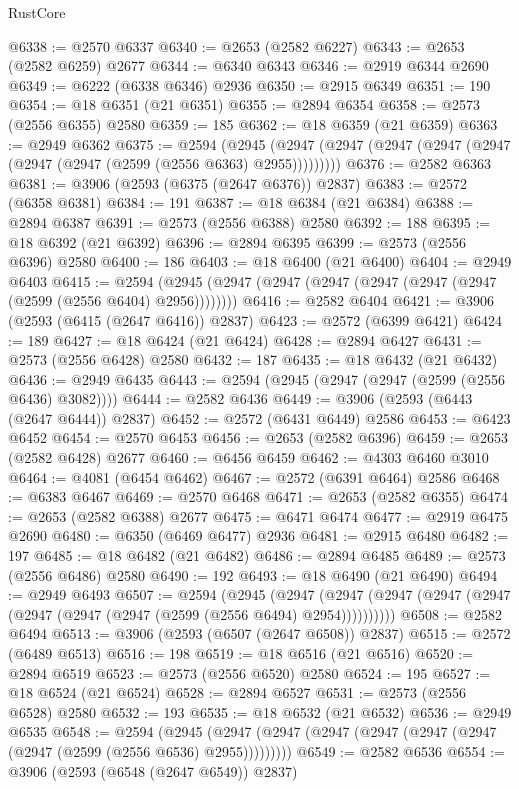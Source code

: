 \begin{lexlean}{RustCore}
\begin{coremodule}
@6338 := @2570 @6337
@6340 := @2653 (@2582 @6227)
@6343 := @2653 (@2582 @6259) @2677
@6344 := @6340 @6343
@6346 := @2919 @6344 @2690
@6349 := @6222 (@6338 @6346) @2936
@6350 := @2915 @6349
@6351 := 190
@6354 := @18 @6351 (@21 @6351)
@6355 := @2894 @6354
@6358 := @2573 (@2556 @6355) @2580
@6359 := 185
@6362 := @18 @6359 (@21 @6359)
@6363 := @2949 @6362
@6375 := @2594
    (@2945 (@2947 (@2947 (@2947 (@2947 (@2947 (@2947 (@2947 (@2599 (@2556 @6363) @2955)))))))))
@6376 := @2582 @6363
@6381 := @3906 (@2593 (@6375 (@2647 @6376)) @2837)
@6383 := @2572 (@6358 @6381)
@6384 := 191
@6387 := @18 @6384 (@21 @6384)
@6388 := @2894 @6387
@6391 := @2573 (@2556 @6388) @2580
@6392 := 188
@6395 := @18 @6392 (@21 @6392)
@6396 := @2894 @6395
@6399 := @2573 (@2556 @6396) @2580
@6400 := 186
@6403 := @18 @6400 (@21 @6400)
@6404 := @2949 @6403
@6415 := @2594 (@2945 (@2947 (@2947 (@2947 (@2947 (@2947 (@2947 (@2599 (@2556 @6404) @2956))))))))
@6416 := @2582 @6404
@6421 := @3906 (@2593 (@6415 (@2647 @6416)) @2837)
@6423 := @2572 (@6399 @6421)
@6424 := 189
@6427 := @18 @6424 (@21 @6424)
@6428 := @2894 @6427
@6431 := @2573 (@2556 @6428) @2580
@6432 := 187
@6435 := @18 @6432 (@21 @6432)
@6436 := @2949 @6435
@6443 := @2594 (@2945 (@2947 (@2947 (@2599 (@2556 @6436) @3082))))
@6444 := @2582 @6436
@6449 := @3906 (@2593 (@6443 (@2647 @6444)) @2837)
@6452 := @2572 (@6431 @6449) @2586
@6453 := @6423 @6452
@6454 := @2570 @6453
@6456 := @2653 (@2582 @6396)
@6459 := @2653 (@2582 @6428) @2677
@6460 := @6456 @6459
@6462 := @4303 @6460 @3010
@6464 := @4081 (@6454 @6462)
@6467 := @2572 (@6391 @6464) @2586
@6468 := @6383 @6467
@6469 := @2570 @6468
@6471 := @2653 (@2582 @6355)
@6474 := @2653 (@2582 @6388) @2677
@6475 := @6471 @6474
@6477 := @2919 @6475 @2690
@6480 := @6350 (@6469 @6477) @2936
@6481 := @2915 @6480
@6482 := 197
@6485 := @18 @6482 (@21 @6482)
@6486 := @2894 @6485
@6489 := @2573 (@2556 @6486) @2580
@6490 := 192
@6493 := @18 @6490 (@21 @6490)
@6494 := @2949 @6493
@6507 := @2594
    (@2945
      (@2947 (@2947 (@2947 (@2947 (@2947 (@2947 (@2947 (@2947 (@2599 (@2556 @6494) @2954))))))))))
@6508 := @2582 @6494
@6513 := @3906 (@2593 (@6507 (@2647 @6508)) @2837)
@6515 := @2572 (@6489 @6513)
@6516 := 198
@6519 := @18 @6516 (@21 @6516)
@6520 := @2894 @6519
@6523 := @2573 (@2556 @6520) @2580
@6524 := 195
@6527 := @18 @6524 (@21 @6524)
@6528 := @2894 @6527
@6531 := @2573 (@2556 @6528) @2580
@6532 := 193
@6535 := @18 @6532 (@21 @6532)
@6536 := @2949 @6535
@6548 := @2594
    (@2945 (@2947 (@2947 (@2947 (@2947 (@2947 (@2947 (@2947 (@2599 (@2556 @6536) @2955)))))))))
@6549 := @2582 @6536
@6554 := @3906 (@2593 (@6548 (@2647 @6549)) @2837)

\end{coremodule}
\end{lexlean}
